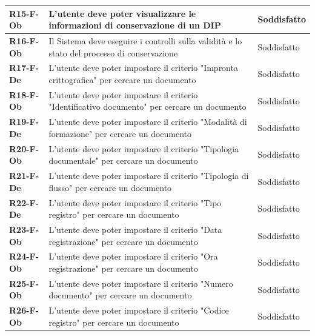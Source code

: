 \documentclass[a4paper,12pt]{article}
\begin{document}
{{\begin{longtable}{|>{\centering\arraybackslash}m{}|>{\centering\arraybackslash}m{}|>{\centering\arraybackslash}m{}|}
                \hline
                \textbf{R15-F-Ob} & L'utente deve poter visualizzare le informazioni di conservazione di un DIP & Soddisfatto \\ 
                \hline
                \textbf{R16-F-Ob} & Il Sistema deve eseguire i controlli sulla validità e lo stato del processo di conservazione & Soddisfatto \\ 
                \hline
                \textbf{R17-F-De} & L'utente deve poter impostare il criterio "Impronta crittografica" per cercare un documento & 
                Soddisfatto \\ 
                \hline
                \textbf{R18-F-Ob} & L'utente deve poter impostare il criterio "Identificativo documento" per cercare un documento & 
                Soddisfatto \\ 
                \hline
                \textbf{R19-F-De} & L'utente deve poter impostare il criterio "Modalità di formazione" per cercare un documento & 
                Soddisfatto \\ 
                \hline
                \textbf{R20-F-Ob} & L'utente deve poter impostare il criterio "Tipologia documentale" per cercare un documento & 
                Soddisfatto \\ 
                \hline
                \textbf{R21-F-De} & L'utente deve poter impostare il criterio "Tipologia di flusso" per cercare un documento & 
                Soddisfatto \\ 
                \hline
                \textbf{R22-F-De} & L'utente deve poter impostare il criterio "Tipo registro" per cercare un documento & 
                Soddisfatto \\
                \hline
                \textbf{R23-F-Ob} & L'utente deve poter impostare il criterio "Data registrazione" per cercare un documento & 
                Soddisfatto \\ 
                \hline
                \textbf{R24-F-Ob} & L'utente deve poter impostare il criterio "Ora registrazione" per cercare un documento & 
                Soddisfatto \\ 
                \hline
                \textbf{R25-F-Ob} & L'utente deve poter impostare il criterio "Numero documento" per cercare un documento & 
                Soddisfatto \\ 
                \hline
                \textbf{R26-F-Ob} & L'utente deve poter impostare il criterio "Codice registro" per cercare un documento & 
                Soddisfatto \\ 

\end{longtable}}}
\end{document}
